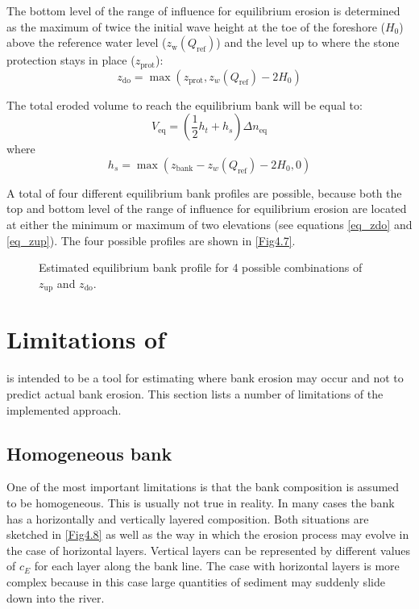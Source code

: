 The bottom level of the range of influence for equilibrium erosion is determined as the maximum of twice the initial wave height at the toe of the foreshore ($H_0$) above the reference water level ($z_\text{w}(Q_\text{ref})$) and the level up to where the stone protection stays in place ($z_\text{prot}$):
\begin{equation}
z_\text{do} = \max (z_\text{prot}, z_w(Q_\text{ref}) - 2 H_0 )
\label{eq_zdo}
\end{equation}	

The total eroded volume to reach the equilibrium bank will be equal to:
\begin{equation}
V_\text{eq} = ( \frac{1}{2} h_t + h_s ) \Delta n_\text{eq}
\end{equation}
where 
\begin{equation}
h_s = \max ( z_\text{bank} - z_w(Q_\text{ref}) - 2 H_0, 0)
\end{equation}

A total of four different equilibrium bank profiles are possible, because both the top and bottom level of the range of influence for equilibrium erosion are located at either the minimum or maximum of two elevations (see equations \autoref{eq_zdo} and \autoref{eq_zup}). The four possible profiles are shown in \autoref{Fig4.7}. 
\begin{figure}[!h]
\center
\resizebox{14cm}{!}{
   
}
\caption{Estimated equilibrium bank profile for 4 possible combinations of $z_\text{up}$ and $z_\text{do}$.}
\label{Fig4.7}
\end{figure}

\section{Limitations of \dfastbe} \label{Sec4.7}

\dfastbe is intended to be a tool for estimating where bank erosion may occur and not to predict actual bank erosion.
This section lists a number of limitations of the implemented approach.

\subsection{Homogeneous bank}

One of the most important limitations is that the bank composition is assumed to be homogeneous.
This is usually not true in reality.
In many cases the bank has a horizontally and vertically layered composition.
Both situations are sketched in \autoref{Fig4.8} as well as the way in which the erosion process may evolve in the case of horizontal layers.
Vertical layers can be represented by different values of $c_E$ for each layer along the bank line.
The case with horizontal layers is more complex because in this case large quantities of sediment may suddenly slide down into the river.

